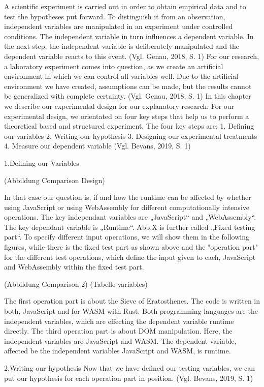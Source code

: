 A scientific experiment is carried out in order to obtain empirical data and to test the hypotheses put forward. To distinguish it from an observation, independent variables are manipulated in an experiment under controlled conditions. The independent variable in turn influences a dependent variable. In the next step, the independent variable is deliberately manipulated and the dependent variable reacts to this event. (Vgl. Genau, 2018, S. 1)
For our research, a laboratory experiment comes into question, as we create an artificial environment in which we can control all variables well. Due to the artificial environment we have created, assumptions can be made, but the results cannot be generalized with complete certainty. (Vgl. Genau, 2018, S. 1)
In this chapter we describe our experimental design for our explanatory research. 
For our experimental design, we orientated on four key steps that help us to perform a theoretical based and structured experiment. The four key steps are: 
1.	Defining our variables
2.	Writing our hypothesis
3.	Designing our experimental treatments
4.	Measure our dependent variable
(Vgl. Bevans, 2019, S. 1)

1.Defining our Variables

(Abbildung Comparison Design)

In that case our question is, if and how the runtime can be affected by whether using JavaScript or using WebAssembly for different computationally intensive operations. The key independant variables are „JavaScript“ and „WebAssembly“. The key dependant variable is „Runtime“. Abb.X is further called „Fixed testing part“.
To specify different input operations, we will show them in the following figures, while there is the fixed test part as shown above and the "operation part" for the different test operations, which define the input given to each, JavaScript and WebAssembly within the fixed test part.

(Abbildung Comparison 2)
(Tabelle variables)

The first operation part is about the Sieve of Eratosthenes. The code is written in both, JavaScript and for WASM with Rust. Both programming languages are the independent variables, which are effecting the dependent variable runtime directly.
The third operation part is about DOM manipulation. Here, the independent variables are JavaScript and WASM. The dependent variable, affected be the independent variables JavaScript and WASM, is runtime.

2.Writing our hypothesis
Now that we have defined our testing variables, we can put our hypothesis for each operation part in position. (Vgl. Bevans, 2019, S. 1)

